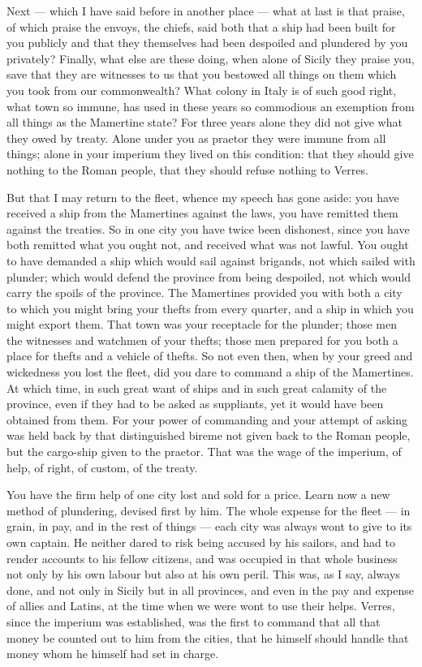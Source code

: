  Next --- which I have said before in another place --- what at last is that praise, of which praise the envoys, the chiefs, said both that a ship had been built for you publicly and that they themselves had been despoiled and plundered by you privately? Finally, what else are these doing, when alone of Sicily they praise you, save that they are witnesses to us that you bestowed all things on them which you took from our commonwealth? What colony in Italy is of such good right, what town so immune, has used in these years so commodious an exemption from all things as the Mamertine state? For three years alone they did not give what they owed by treaty. Alone under you as praetor they were immune from all things; alone in your imperium they lived on this condition: that they should give nothing to the Roman people, that they should refuse nothing to Verres.

 But that I may return to the fleet, whence my speech has gone aside: you have received a ship from the Mamertines against the laws, you have remitted them against the treaties. So in one city you have twice been dishonest, since you have both remitted what you ought not, and received what was not lawful. You ought to have demanded a ship which would sail against brigands, not which sailed with plunder; which would defend the province from being despoiled, not which would carry the spoils of the province. The Mamertines provided you with both a city to which you might bring your thefts from every quarter, and a ship in which you might export them. That town was your receptacle for the plunder; those men the witnesses and watchmen of your thefts; those men prepared for you both a place for thefts and a vehicle of thefts. So not even then, when by your greed and wickedness you lost the fleet, did you dare to command a ship of the Mamertines. At which time, in such great want of ships and in such great calamity of the province, even if they had to be asked as suppliants, yet it would have been obtained from them. For your power of commanding and your attempt of asking was held back by that distinguished bireme not given back to the Roman people, but the cargo-ship given to the praetor. That was the wage of the imperium, of help, of right, of custom, of the treaty.

 You have the firm help of one city lost and sold for a price. Learn now a new method of plundering, devised first by him. The whole expense for the fleet --- in grain, in pay, and in the rest of things --- each city was always wont to give to its own captain. He neither dared to risk being accused by his sailors, and had to render accounts to his fellow citizens, and was occupied in that whole business not only by his own labour but also at his own peril. This was, as I say, always done, and not only in Sicily but in all provinces, and even in the pay and expense of allies and Latins, at the time when we were wont to use their helps. Verres, since the imperium was established, was the first to command that all that money be counted out to him from the cities, that he himself should handle that money whom he himself had set in charge.

